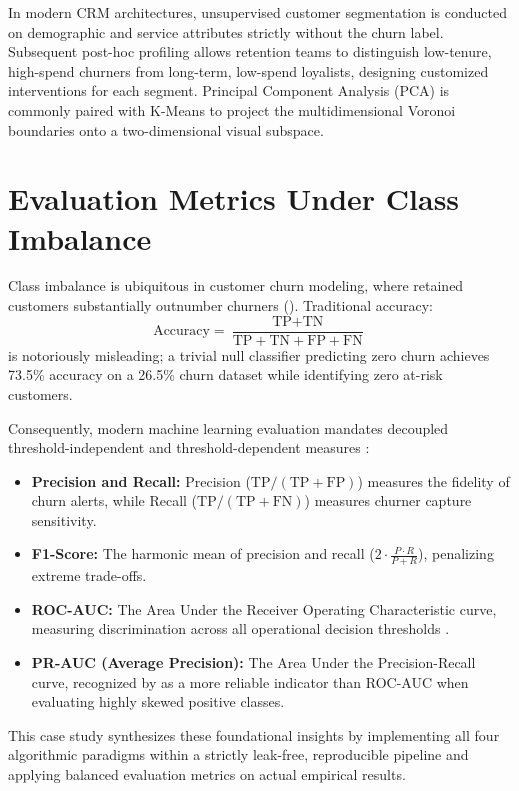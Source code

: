\documentclass[12pt,a4paper]{report}
\begin{document}
In modern CRM architectures, unsupervised customer segmentation is conducted on demographic and service attributes strictly without the churn label. Subsequent post-hoc profiling allows retention teams to distinguish low-tenure, high-spend churners from long-term, low-spend loyalists, designing customized interventions for each segment. Principal Component Analysis (PCA) is commonly paired with K-Means to project the multidimensional Voronoi boundaries onto a two-dimensional visual subspace.

\section{Evaluation Metrics Under Class Imbalance}
Class imbalance is ubiquitous in customer churn modeling, where retained customers substantially outnumber churners (\citet{chawla2002smote}). Traditional accuracy:
\begin{equation}
    \text{Accuracy} = \frac{\text{TP} + \text{TN}}{\text{TP} + \text{TN} + \text{FP} + \text{FN}}
\end{equation}
is notoriously misleading; a trivial null classifier predicting zero churn achieves 73.5\% accuracy on a 26.5\% churn dataset while identifying zero at-risk customers. 

Consequently, modern machine learning evaluation mandates decoupled threshold-independent and threshold-dependent measures \citep{fawcett2006introduction, davis2006relationship}:
\begin{itemize}
    \item \textbf{Precision and Recall:} Precision ($\text{TP} / (\text{TP} + \text{FP})$) measures the fidelity of churn alerts, while Recall ($\text{TP} / (\text{TP} + \text{FN})$) measures churner capture sensitivity.
    \item \textbf{F1-Score:} The harmonic mean of precision and recall ($2 \cdot \frac{P \cdot R}{P + R}$), penalizing extreme trade-offs.
    \item \textbf{ROC-AUC:} The Area Under the Receiver Operating Characteristic curve, measuring discrimination across all operational decision thresholds \citep{fawcett2006introduction}.
    \item \textbf{PR-AUC (Average Precision):} The Area Under the Precision-Recall curve, recognized by \citet{davis2006relationship} as a more reliable indicator than ROC-AUC when evaluating highly skewed positive classes.
\end{itemize}

This case study synthesizes these foundational insights by implementing all four algorithmic paradigms within a strictly leak-free, reproducible pipeline and applying balanced evaluation metrics on actual empirical results.
\end{document}
